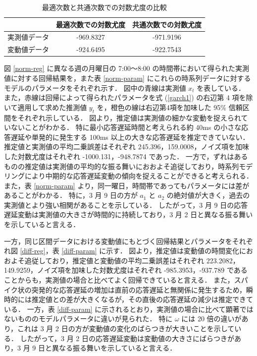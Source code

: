 \documentclass[technicalreport]{ieicej}
\begin{document}
\begin{table}[tb]
\centering
\caption{最適次数と共通次数での対数尤度の比較}
\label{more-param}
\begin{tabular}{|l|c|c|}
\hline
&最適次数での対数尤度&共通次数での対数尤度\\
\hline
実測値データ&-969.8327&-971.9196\\
\hline
変動値データ&-924.6495&-922.7543\\
\hline
\end{tabular}
\end{table}

図 \ref{norm-reg} に異なる週の月曜日の 7:00～8:00 の時間帯において得られた実測値に対する回帰結果を，また表 \ref{norm-param} にこれらの時系列データに対するモデルのパラメータをそれぞれ示す．
図中の青線は実測値 $x_t$ を表している．
また，赤線は回帰によって得られたパラメータを式 (\ref{garch1}) の右辺第 4 項を除いて適用して求めた推測値 $y_t$ を，橙色の線は右辺第4項を加味した 95\% 信頼区間をそれぞれ示している．
図より，推定値は実測値の細かな変動を捉えられていないことがわかる．
特に最小応答遅延時間と考えられる約 40ms の小さな応答遅延や単発的に発生する 100ms 以上の大きな応答遅延を推定できていない．
推定値と実測値の平均二乗誤差はそれぞれ 245.396，159.0008，ノイズ項を加味した対数尤度はそれぞれ -1000.131，-948.7874 であった．
一方で，ずれはあるものの推定値は実測値の平均的な振る舞いにおおよそ追従しており，時系列モデリングにより中期的な応答遅延変動の傾向を捉えることができると考えられる．
また，表 \ref{norm-param} より，同一曜日，時間帯であってもパラメータには差があることがわかる．
特に，3 月 9 日の方が $a_1$ と $a_2$ の絶対値が大きく，過去の実測値とより強い相関があることを示している．
したがって，3 月 9 日の応答遅延変動は実測値の大きさが時間的に持続しており，3 月 2 日と異なる振る舞いを示していると言える．


一方，同じ区間データにおける変動値にもとづく回帰結果とパラメータをそれぞれ図 \ref{diff-reg}，表 \ref{diff-param} に示す．
図より，推定値は変動値の時間変化におおよそ追従しており，推定値と変動値の平均二乗誤差はそれぞれ 223.2082，149.9259，ノイズ項を加味した対数尤度はそれぞれ -985.3953，-937.789 であることからも，実測値の場合と比べてよく回帰できていると言える．
また，スパイク状の突発的な応答遅延の増加は直前の応答遅延と無関係に発生するため，瞬時的には推定値との差が大きくなるが，その直後の応答遅延の減少は推定できている．
一方，表 \ref{diff-param} に示されるとおり，実測値の場合に比べて顕著ではないもののモデルパラメータに違いが見られた．
特に $\omega$ には 20 倍の違いがあり，これは 3 月 2 日の方が変動値の変化のばらつきが大きいことを示している．
したがって，3 月 2 日の応答遅延変動は変動値の大きさにばらつきがあり，3 月 9 日と異なる振る舞いを示していると言える．
\end{document}
